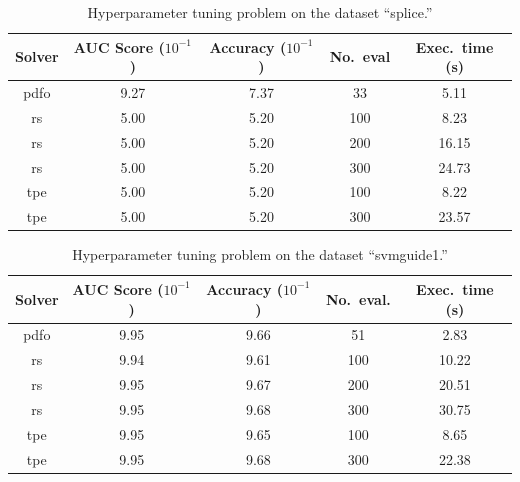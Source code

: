 \documentclass[
    smallextended,  %
    final,        %
]{svjour3}
\begin{document}
\begin{table}[!ht]
    \caption{Hyperparameter tuning problem on the dataset ``splice.''}
    \label{tab:splice}
    \centering
    \begin{tabular}{cSSS[table-format=3]S}
        \toprule
        Solver      & {AUC Score ($10^{-1}$)}   & {Accuracy ($10^{-1}$)}    & {No.\ eval}   & {Exec.\ time (\si{\second})}\\
        \midrule
        \Gls{pdfo}  & 9.27                      & 7.37                      & 33            & 5.11\\
        \Gls{rs}    & 5.00                      & 5.20                      & 100           & 8.23\\
        \Gls{rs}    & 5.00                      & 5.20                      & 200           & 16.15\\
        \Gls{rs}    & 5.00                      & 5.20                      & 300           & 24.73\\
        \Gls{tpe}   & 5.00                      & 5.20                      & 100           & 8.22\\
        \Gls{tpe}   & 5.00                      & 5.20                      & 300           & 23.57\\
        \bottomrule
    \end{tabular}
\end{table}

\begin{table}[!ht]
    \caption{Hyperparameter tuning problem on the dataset ``svmguide1.''}
    \centering
    \begin{tabular}{cS[table-format=3]SSS}
        \toprule
        Solver      & {AUC Score ($10^{-1}$)}   & {Accuracy ($10^{-1}$)}    & {No.\ eval.}  & {Exec.\ time (\si{\second})}\\
        \midrule
        \Gls{pdfo}  & 9.95                      & 9.66                      & 51            & 2.83\\
        \Gls{rs}    & 9.94                      & 9.61                      & 100           & 10.22\\
        \Gls{rs}    & 9.95                      & 9.67                      & 200           & 20.51\\
        \Gls{rs}    & 9.95                      & 9.68                      & 300           & 30.75\\
        \Gls{tpe}   & 9.95                      & 9.65                      & 100           & 8.65\\
        \Gls{tpe}   & 9.95                      & 9.68                      & 300           & 22.38\\
        \bottomrule
    \end{tabular}
\end{table}
\end{document}
